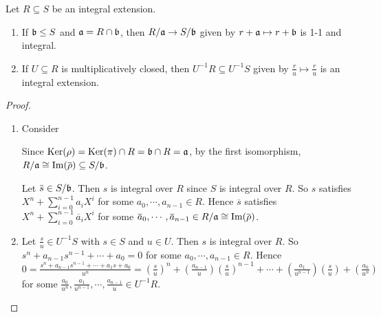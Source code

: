 \begin{proposition}\label{5.22}
    Let $R \subseteq S$ be an integral extension.
    \begin{enumerate}
        \item\label{5.22a} If $\mathfrak{b} \leq S$ and $\mathfrak{a} = R \cap \mathfrak{b}$, then $R/\mathfrak{a} \to S/\mathfrak{b}$ given by $r+\mathfrak{a} \mapsto r+\mathfrak{b}$ is 1-1 and integral. 
        \item\label{5.22b} If $U \subseteq R$ is multiplicatively closed, then $U^{-1}R \subseteq U^{-1}S$ given by $\frac{r}{u} \mapsto \frac{r}{u}$ is an integral extension.
    \end{enumerate}
\end{proposition}

\begin{proof}
    \begin{enumerate}
        \item Consider
            \begin{center}
            \end{center}
            Since $\operatorname{Ker}(\rho) = \operatorname{Ker}(\pi) \cap R = \mathfrak{b} \cap R = \mathfrak{a}$, by the first isomorphism, $R/\ffa \cong \im(\overbar{\rho}) \subseteq S/\ffb$. \par 
            Let $\overbar{s} \in S/\ffb$. Then $s$ is integral over $R$ since $S$ is integral over $R$. So $s$ satisfies $X^{n} + \sum_{i=0}^{n-1}a_iX^{i}$ for some $a_0,\cdots,a_{n-1} \in R$. Hence $\overbar{s}$ satisfies $X^{n} + \sum_{i=0}^{n-1} \overbar{a}_iX^{i}$ for some $\overbar{a}_0,\cdots,\overbar{a}_{n-1} \in R/\ffa \cong \im(\overbar{\rho})$.
        \item Let $\frac{s}{u} \in U^{-1}S$ with $s \in S$ and $u \in U$. Then $s$ is integral over $R$. So $s^{n} + a_{n-1}s^{n-1} + \cdots + a_0 = 0$ for some $a_0,\cdots,a_{n-1} \in R$. Hence $0 = \frac{s^{n}+a_{n-1}s^{n-1} + \cdots + a_1s + a_0}{u^{n}} = (\frac{s}{u})^{n} + (\frac{a_{n-1}}{u})(\frac{s}{u})^{n-1} + \cdots + (\frac{a_1}{u^{n-1}})(\frac{s}{u}) + (\frac{a_0}{u^{n}})$ for some $\frac{a_0}{u^{n}},\frac{a_1}{u^{n-1}},\cdots,\frac{a_{n-1}}{u} \in U^{-1}R$. \qedhere
    \end{enumerate}
\end{proof}

